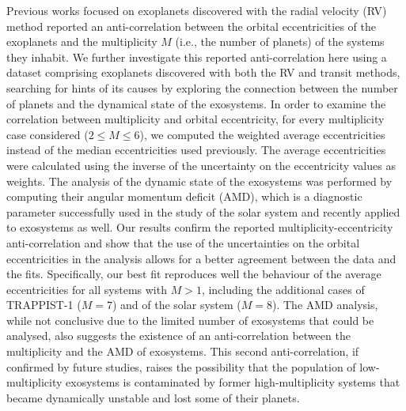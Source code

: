 \documentclass[letter]{aa} %
\begin{document}
        \abstract
        {Previous works focused on exoplanets discovered with the radial velocity (RV) method reported an anti-correlation between the orbital eccentricities of the exoplanets and the multiplicity $M$ (i.e., the number of planets) of the systems they inhabit.}
        {We further investigate this reported anti-correlation here using a dataset comprising exoplanets discovered with both the RV and transit methods,  searching for hints of its causes by exploring the connection between the number of planets and the dynamical state of the exosystems.}
        {In order to examine the correlation between multiplicity and orbital eccentricity, for every multiplicity case considered ($2 \leq M \leq 6$), we computed the weighted average eccentricities instead of the median eccentricities used previously. The average eccentricities were calculated using the inverse of the uncertainty on the eccentricity values as weights. The analysis of the dynamic state of the exosystems was performed by computing their angular momentum deficit (AMD), which is a diagnostic parameter successfully used in the study of the solar system and recently applied to exosystems as well.}
        {Our results confirm the reported multiplicity-eccentricity anti-correlation and show that the use of the uncertainties on the orbital eccentricities in the analysis allows for a better agreement between the data and the fits. Specifically, our best fit reproduces well the behaviour of the average eccentricities for all systems with $M>1$, including the additional cases of TRAPPIST-1 ($M=7$) and of the solar system ($M=8$).  The AMD analysis, while not conclusive due to the limited number of exosystems that could be analysed, also suggests the existence of an anti-correlation between the multiplicity and the AMD of exosystems. This second anti-correlation, if confirmed by future studies, raises the possibility that the population of low-multiplicity exosystems is contaminated by former high-multiplicity systems that became dynamically unstable and lost some of their planets.
        }
        {}
        
        
\end{document}
